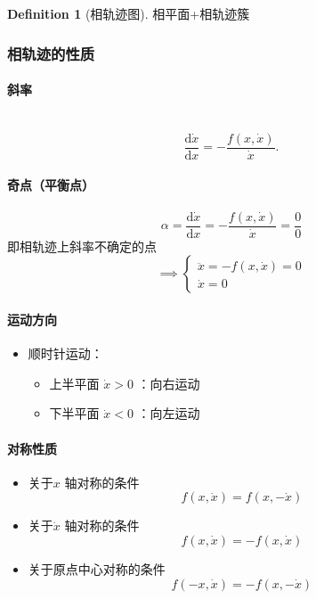 \documentclass[14pt,a4paper]{article}
\theoremstyle{plain}
\theoremstyle{definition}
\newtheorem*{dfn}{Definition}
\theoremstyle{remark}
\theoremstyle{plain}
\theoremstyle{plain}
\theoremstyle{plain}
\theoremstyle{definition}
\theoremstyle{remark}
\numberwithin{equation}{section}
\begin{document}
			\begin{dfn}[相轨迹图]  
			\label{dfn:相轨迹图}
				相平面+相轨迹簇 
			\end{dfn} 

			\subsubsection{相轨迹的性质}%
			\label{ssub:相轨迹的性质}
			
				\paragraph{斜率}%
				\label{par:斜率}
					\ 
					\[
						\dfrac{\mathrm d\dot x}{\mathrm dx} = - \dfrac{f(x, \dot x)}{\dot x} 
					.\] 

				\paragraph{奇点（平衡点）}%
				\label{par:奇点_平衡点_}
				
					\[
						\alpha=\dfrac{\mathrm d\dot x}{\mathrm dx} = - \dfrac{f(x, \dot x)}{\dot x} =  \dfrac{0}{0} 
					\]
					即相轨迹上斜率不确定的点
					\[
					\implies \begin{cases}
                        \ddot x = -f(x, \dot x) = 0\\
						\dot x = 0
					\end{cases} 
					\] 
				
				\paragraph{运动方向}%
				\label{par:运动方向}
				
					\begin{itemize}
						\item 顺时针运动：
							\begin{itemize}
								\item 上半平面 $\dot x>0$ ：向右运动
								\item 下半平面 $\dot x<0$ ：向左运动
							\end{itemize}  
					\end{itemize}  	

				\paragraph{对称性质}%
				\label{par:对称性质}
					\begin{itemize}
						\item 关于$x$ 轴对称的条件
							\[
								f(x,\dot x) = f(x, -\dot x)
							\] 
						\item 关于$\dot x$ 轴对称的条件
							\[
								f(x,\dot x) = -f(x, \dot x)
							\] 
						\item 关于原点中心对称的条件
							\[
								f(-x,\dot x) = -f(x, -\dot x)
							\] 
					\end{itemize}  
	
\end{document}
